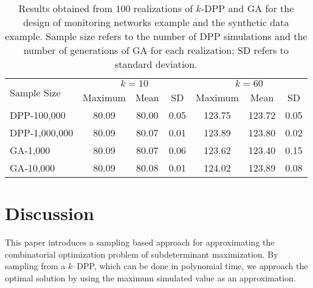 \documentclass[]{interact}
\theoremstyle{plain}%
\theoremstyle{definition}
\theoremstyle{remark}
\begin{document}
\begin{table}[p]
    \centering
	\begin{tabular}{lcccccc}
	\toprule
	\multirow{2}[3]{*}{Sample Size} & \multicolumn{3}{c}{$k=10$} & \multicolumn{3}{c}{$k=60$} \\
	\cmidrule(lrr){2-4} \cmidrule(lrr){5-7}
 	& Maximum & Mean & SD & Maximum & Mean & SD \\
	\midrule
	DPP-100,000 & 80.09 & 80.00 & 0.05 & 123.75 & 123.72 & 0.05 \\
	DPP-1,000,000 & 80.09 & 80.07 & 0.01 & 123.89 & 123.80 & 0.02 \\
	GA-1,000 & 80.09 & 80.07 & 0.06 & 123.62 & 123.40 & 0.15 \\
	GA-10,000 & 80.09 & 80.08 & 0.01 & 124.02 & 123.89 & 0.08 \\
	\bottomrule
	\end{tabular}
	\caption{Results obtained from $100$ realizations of $k$-DPP and GA for the design of monitoring networks example and the synthetic data example. Sample size refers to the number of DPP simulations and the number of generations of GA for each realization; SD refers to standard deviation.}\label{tab:t1}
\end{table}


\section{Discussion}
This paper introduces a sampling based approach for approximating the combinatorial optimization problem of subdeterminant maximization. By sampling from a $k$--DPP, which can be done in polynomial time, we approach the optimal solution by using the maximum  simulated value as an approximation.
\end{document}

